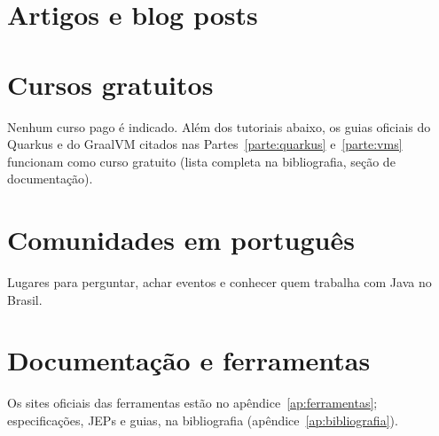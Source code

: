 
\section{Artigos e blog posts}


\section{Cursos gratuitos}
Nenhum curso pago é indicado. Além dos tutoriais abaixo, os guias oficiais do
Quarkus e do GraalVM citados nas Partes~\ref{parte:quarkus} e~\ref{parte:vms} funcionam como curso
gratuito (lista completa na bibliografia, seção de documentação).


\section{Comunidades em português}
Lugares para perguntar, achar eventos e conhecer quem trabalha com Java no
Brasil.


\section{Documentação e ferramentas}
Os sites oficiais das ferramentas estão no apêndice~\ref{ap:ferramentas};
especificações, JEPs e guias, na bibliografia (apêndice~\ref{ap:bibliografia}).
